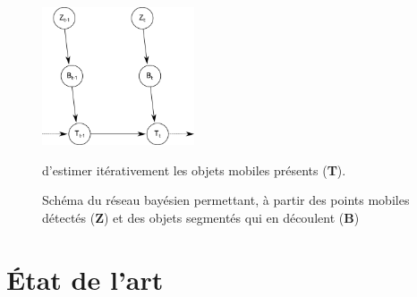 \begin{figure}
	\begin{center}
		\includegraphics[width=0.4\textwidth]{Chapter5/graphics/intro_bayesian_network.png}
	\end{center}
	\caption{Schéma du réseau bayésien permettant, à partir des points mobiles détectés (\textbf{Z}) et des objets segmentés qui en découlent (\textbf{B})} d'estimer itérativement les objets mobiles présents (\textbf{T}).
	\label{fig:ch5_intro_bayesian_network}	
\end{figure}

\section{État de l'art}
